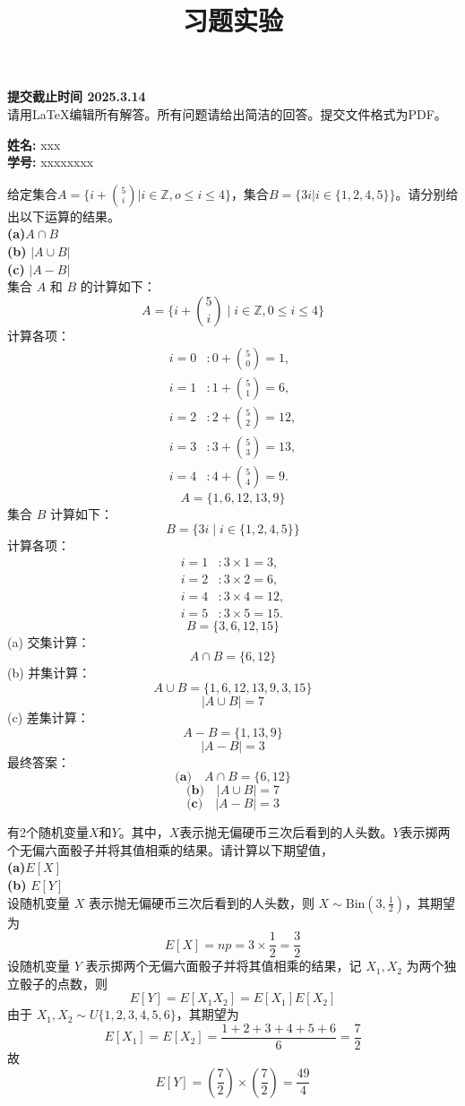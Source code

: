 \documentclass[12pt,twoside]{article}
\title{ 习题实验}
\newcommand{\theproblemsetnum}{1}
\newcommand{\releasedate}{2025.3.6}
\newcommand{\partaduedate}{ 2025.3.14}
\begin{document}
\handout{习题实验 \theproblemsetnum}{\releasedate}
\textbf{提交截止时间 {\bf \partaduedate}}\\
请用\LaTeX 编辑所有解答。所有问题请给出简洁的回答。提交文件格式为PDF。

\setlength{\parindent}{0pt}
\medskip\hrulefill\medskip

{\bf 姓名:} xxx\\
{\bf 学号:} xxxxxxxx
\medskip


\medskip\hrulefill

\begin{problems}

\problem  %
给定集合$A=\{i+ \binom{5}{i}|i\in \mathbb{Z}, o\leq i\leq 4\}$，集合$B=\{3i|i\in \{1, 2, 4, 5\}\}$。请分别给出以下运算的结果。\\
\textbf{(a)}$A\cap B$ \\
\textbf{(b)} $|A\cup B|$ \\
\textbf{(c)} $|A-B|$ \\
集合 $A$ 和 $B$ 的计算如下：
\[
A = \{ i + \binom{5}{i} \mid i \in \mathbb{Z}, 0 \leq i \leq 4 \}
\]
计算各项：
\[
\begin{aligned}
i = 0 &: 0 + \binom{5}{0} = 1, \\
i = 1 &: 1 + \binom{5}{1} = 6, \\
i = 2 &: 2 + \binom{5}{2} = 12, \\
i = 3 &: 3 + \binom{5}{3} = 13, \\
i = 4 &: 4 + \binom{5}{4} = 9.
\end{aligned}
\]
\[
A = \{1, 6, 12, 13, 9\}
\]
集合 $B$ 计算如下：
\[
B = \{3i \mid i \in \{1, 2, 4, 5\} \}
\]
计算各项：
\[
\begin{aligned}
i = 1 &: 3 \times 1 = 3, \\
i = 2 &: 3 \times 2 = 6, \\
i = 4 &: 3 \times 4 = 12, \\
i = 5 &: 3 \times 5 = 15.
\end{aligned}
\]
\[
B = \{3, 6, 12, 15\}
\]
(a) 交集计算：
\[
A \cap B = \{6, 12\}
\]
(b) 并集计算：
\[
A \cup B = \{1, 6, 12, 13, 9, 3, 15\}
\]
\[
|A \cup B| = 7
\]
(c) 差集计算：
\[
A - B = \{1, 13, 9\}
\]
\[
|A - B| = 3
\]
最终答案：
\[
\textbf{(a)} \quad A \cap B = \{6, 12\}
\]
\[
\textbf{(b)} \quad |A \cup B| = 7
\]
\[
\textbf{(c)} \quad |A - B| = 3
\]


\newpage
\problem  %
有2个随机变量$X$和$Y$。其中，$X$表示抛无偏硬币三次后看到的人头数。$Y$表示掷两个无偏六面骰子并将其值相乘的结果。请计算以下期望值，\\
\textbf{(a)}$E[X]$ \\
\textbf{(b)} $E[Y]$ \\
设随机变量 $X$ 表示抛无偏硬币三次后看到的人头数，则 $X \sim \text{Bin}(3, \frac{1}{2})$，其期望为  
\[
E[X] = np = 3 \times \frac{1}{2} = \frac{3}{2}
\]  
设随机变量 $Y$ 表示掷两个无偏六面骰子并将其值相乘的结果，记 $X_1, X_2$ 为两个独立骰子的点数，则  
\[
E[Y] = E[X_1 X_2] = E[X_1]E[X_2]
\]  
由于 $X_1, X_2 \sim U\{1,2,3,4,5,6\}$，其期望为  
\[
E[X_1] = E[X_2] = \frac{1+2+3+4+5+6}{6} = \frac{7}{2}
\]  
故  
\[
E[Y] = \left(\frac{7}{2}\right) \times \left(\frac{7}{2}\right) = \frac{49}{4}
\]  


\end{problems}
\end{document}
